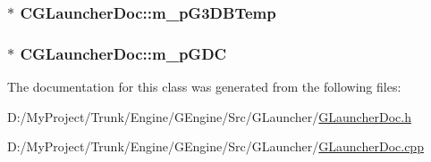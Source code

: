\subsubsection[{m\+\_\+p\+G3\+D\+B\+Temp}]{$\ast$ C\+G\+Launcher\+Doc\+::m\+\_\+p\+G3\+D\+B\+Temp}\label{class_c_g_launcher_doc_aa21718d91a4d4a4aea132a01be15998a}
\hypertarget{class_c_g_launcher_doc_a344922749fac9775a77e51a64c6bebbb}{}
\subsubsection[{m\+\_\+p\+G\+D\+C}]{$\ast$ C\+G\+Launcher\+Doc\+::m\+\_\+p\+G\+D\+C}\label{class_c_g_launcher_doc_a344922749fac9775a77e51a64c6bebbb}


The documentation for this class was generated from the following files\+:\begin{DoxyCompactItemize}
\item 
D\+:/\+My\+Project/\+Trunk/\+Engine/\+G\+Engine/\+Src/\+G\+Launcher/\hyperlink{_g_launcher_doc_8h}{G\+Launcher\+Doc.\+h}\item 
D\+:/\+My\+Project/\+Trunk/\+Engine/\+G\+Engine/\+Src/\+G\+Launcher/\hyperlink{_g_launcher_doc_8cpp}{G\+Launcher\+Doc.\+cpp}\end{DoxyCompactItemize}

